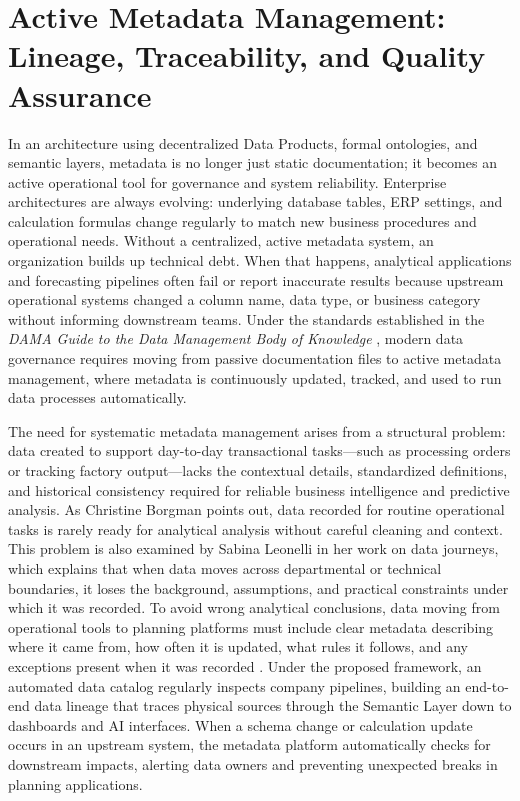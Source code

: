 \section[Active Metadata Management]{Active Metadata Management: Lineage, Traceability, and Quality Assurance}
\label{sec:metadata_management}

In an architecture using decentralized Data Products, formal ontologies, and semantic layers, metadata is no longer just static documentation; 
it becomes an active operational tool for governance and system reliability. Enterprise architectures are always evolving: underlying database tables, ERP settings, 
and calculation formulas change regularly to match new business procedures and operational needs. 
Without a centralized, active metadata system, an organization builds up technical debt. When that happens, analytical applications and forecasting pipelines 
often fail or report inaccurate results because upstream operational systems changed a column name, data type, or business category without informing downstream teams. 
Under the standards established in the \textit{DAMA Guide to the Data Management Body of Knowledge} \cite{dama2024dmbok}, modern data governance requires moving from passive 
documentation files to active metadata management, where metadata is continuously updated, tracked, and used to run data processes automatically.

The need for systematic metadata management arises from a structural problem: data created to support day-to-day transactional tasks—such as processing orders or tracking factory 
output—lacks the contextual details, standardized definitions, and historical consistency required for reliable business intelligence and predictive analysis.
As Christine Borgman \cite{borgman2015big} points out, data recorded for routine operational tasks is rarely ready for analytical analysis without careful cleaning and context. 
This problem is also examined by Sabina Leonelli \cite{Leonelli2016data} in her work on data journeys, which explains that when data moves across departmental or technical boundaries, 
it loses the background, assumptions, and practical constraints under which it was recorded. 
To avoid wrong analytical conclusions, data moving from operational tools to planning platforms must include clear metadata describing where it came from, 
how often it is updated, what rules it follows, and any exceptions present when it was recorded \cite{borgman2015big, Leonelli2016data}.
Under the proposed framework, an automated data catalog regularly inspects company pipelines, building an end-to-end data lineage that traces physical sources through 
the Semantic Layer down to dashboards and AI interfaces. When a schema change or calculation update occurs in an upstream system, the metadata platform automatically 
checks for downstream impacts, alerting data owners and preventing unexpected breaks in planning applications.

